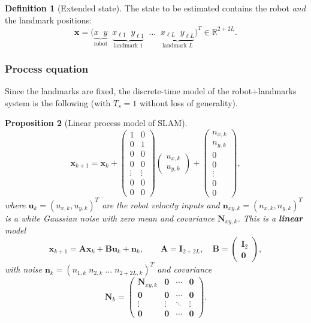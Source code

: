 \documentclass[11pt,a4paper]{article}
\theoremstyle{definition}
\newtheorem{definition}{Definition}[section]
\theoremstyle{plain}
\newtheorem{proposition}[definition]{Proposition}
\theoremstyle{remark}
\newcommand{\R}{\mathbb{R}}
\begin{document}
\begin{definition}[Extended state]
\label{def:extstate}
The state to be estimated contains the robot \emph{and} the landmark positions:
\[
\bm x=\bigl(\underbrace{x\;\;y}_{\text{robot}}\;\;\underbrace{x_{\ell1}\;\;y_{\ell1}}_{\text{landmark }1}\;\;\dots\;\;\underbrace{x_{\ell L}\;\;y_{\ell L}}_{\text{landmark }L}\bigr)^T\in\R^{2+2L}.
\]
\end{definition}

\subsubsection*{Process equation}
Since the landmarks are fixed, the discrete-time model of the robot+landmarks system is the following (with $T_s=1$ without loss of generality).

\begin{proposition}[Linear process model of SLAM]
\label{prop:slamproc}
\[
\bm x_{k+1}=\bm x_k+
\begin{pmatrix}1&0\\0&1\\0&0\\0&0\\\vdots&\vdots\\0&0\\0&0\end{pmatrix}
\begin{pmatrix}u_{x,k}\\u_{y,k}\end{pmatrix}+
\begin{pmatrix}n_{x,k}\\n_{y,k}\\0\\0\\\vdots\\0\\0\end{pmatrix},
\]
where $\bm u_k=(u_{x,k},u_{y,k})^T$ are the robot velocity inputs and $\bm n_{xy,k}=(n_{x,k},n_{y,k})^T$ is a white Gaussian noise with zero mean and covariance $\bm N_{xy,k}$. This is a \textbf{linear} model
\[
\bm x_{k+1}=\bm A\bm x_k+\bm B\bm u_k+\bm n_k,\qquad \bm A=\bm I_{2+2L},\quad \bm B=\begin{pmatrix}\bm I_2\\\bm 0\end{pmatrix},
\]
with noise $\bm n_k=(n_{1,k}\;n_{2,k}\;\dots\;n_{2+2L,k})^T$ and covariance
\[
\bm N_k=\begin{pmatrix}\bm N_{xy,k}&\bm 0&\cdots&\bm 0\\\bm 0&\bm 0&\cdots&\bm 0\\\vdots&\vdots&\ddots&\vdots\\\bm 0&\bm 0&\cdots&\bm 0\end{pmatrix}.
\]
\end{proposition}
\end{document}
